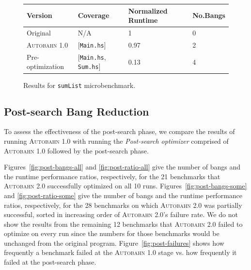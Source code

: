 \documentclass[format=sigplan, review=true, 9pt]{acmart}
\newcommand{\cut}[1]{}
\newcommand{\figref}[1]{Figure~\ref{#1}}
\newcommand{\scaption}[1]{\caption{#1}}
\newcommand{\hotspotcost}[0]{\textit{hotSpotThreshold}}
\newcommand{\Ao}[0]{\textsc{Autobahn 1.0}}
\newcommand{\At}[0]{\textsc{Autobahn 2.0}}
\newcommand{\postopt}[0]{post-search}
\newcommand{\Postopt}[0]{Post-search}
\newcommand{\absim}[0]{\textit{absenceImpact}}
\begin{document}
\begin{figure}
\begin{tabular}{p{2.5cm}p{1.5cm}p{2cm}p{1cm}}
\hline
Version   & Coverage & Normalized Runtime & No.Bangs \\
\hline
Original      & N/A   &   1	 & 0   \\
\Ao{}       & [\texttt{Main.hs}]      & 0.97    &  2\\
Pre-optimization	& [\texttt{Main.hs}, \texttt{Sum.hs}]         & 0.13      & 4\\
\hline
\end{tabular}
\scaption{Results for \texttt{sumList} microbenchmark.}
\label{fig:sumList}
\end{figure}

\subsection{\Postopt{} Bang Reduction}

To assess the effectiveness of the \postopt{} phase,
we compare the results of running \Ao{} with running 
the \textit{\Postopt{} optimizer} comprised of \Ao{} followed by
the \postopt{} phase.
\cut{
Already discussed and so not necessary:
Similarly, we took the mean of running the
program ten times on the NoFib benchmark suite while optimizing on
runtime only, and set both \hotspotcost{} and \absim{} thresholds to
6\%.
A benchmark is successfully optimized if \Ao{} improved its
performance by at least 6\% after optimization. }
Figures~\ref{fig:post-bangs-all} and \ref{fig:post-ratio-all}
give the number of bangs and the runtime performance ratios,
respectively, for the 21 benchmarks that \At{} successfully optimized on all 10 runs. 
Figures~\ref{fig:post-bangs-some} and \ref{fig:post-ratio-some}
give the number of bangs and the runtime performance ratios, respectively,
for the 28 benchmarks on which \At{} was partially successful,
sorted in increasing order of \At{}'s failure rate.
We do not show the results from the remaining 12 benchmarks that \At{}
failed to optimize on every run since the numbers for those benchmarks
would be unchanged from the original program.  \figref{fig:post-failures} shows how
frequently a benchmark failed at the \Ao{} stage vs. how frequently it
failed at the \postopt{} phase.
\end{document}

